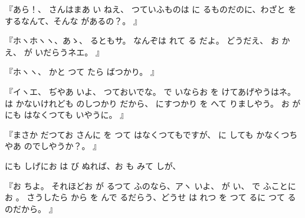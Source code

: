 『あら！、
さんはまあ
い
ねえ、
つていふものは
に
るものだのに、わざと
をするなんて、そんな
があるの？。
』

『ホヽホヽヽ、あゝ、
るともサ。
なんぞは
れて
る
だよ。
どうだえ、
お
かえ、
が
いだらうネエ。
』

『ホヽヽ、
かと
つて
たら
ばつかり。
』

『イヽエ、
ぢやあ
いよ、
つておいでな。
で
いならお
を
けてあげやうはネ。
は
かないけれども
のしつかり
だから、
にすつかり
を
へて
りましやう。
お
が
にも
はなくつても
いやうに。
』

『まさか
だつてお
さんに
を
つて
はなくつてもですが、
に
しても
かなくつちやあ
のでしやうか？。
』

にも
しげにお
は
び
ぬれば、お
も
みて
しが、

『お
ちよ。
それほどお
が
るつて
ふのなら、アヽ
いよ、
が
い、
で
ふことにお
。
さうしたら
から
を
んで
るだらう、どうせ
は
れつ
を
つて
るに
つて
るのだから。
』

